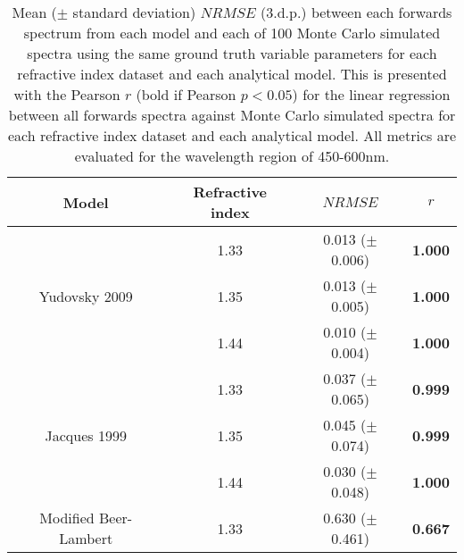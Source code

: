 \begin{table}[bhp]
    \centering
    \caption{Mean ($\pm$ standard deviation) $NRMSE$ (3.d.p.) between each forwards spectrum from each model and each of 100 Monte Carlo simulated spectra using the same ground truth variable parameters for each refractive index dataset and each analytical model. This is presented with the Pearson $r$ (bold if Pearson $p < 0.05$) for the linear regression between all forwards spectra against Monte Carlo simulated spectra for each refractive index dataset and each analytical model. All metrics are evaluated for the wavelength region of 450-600nm.}
    \begin{tabular}{|c|c|c|c|}
        \hline
        Model & Refractive index & $NRMSE$ & $r$ \\
        \hline
        \multirow{3}{*}{Yudovsky 2009} & 1.33 & 0.013 ($\pm$ 0.006) & \textbf{1.000} \\
        & 1.35 & 0.013 ($\pm$ 0.005) & \textbf{1.000} \\
        & 1.44 & 0.010 ($\pm$ 0.004) & \textbf{1.000} \\
        \hline
        \multirow{3}{*}{Jacques 1999} & 1.33 & 0.037 ($\pm$ 0.065) & \textbf{0.999} \\
        & 1.35 & 0.045 ($\pm$ 0.074) & \textbf{0.999} \\
        & 1.44 & 0.030 ($\pm$ 0.048) & \textbf{1.000} \\
        \hline
        \multirow{3}{*}{Modified Beer-Lambert} & 1.33 & 0.630 ($\pm$ 0.461) & \textbf{0.667} \\

\end{tabular}
\end{table}

